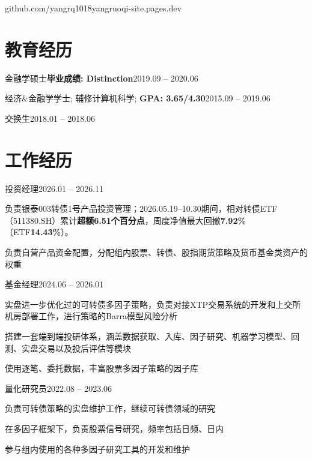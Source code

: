 \documentclass[a4paper,10pt]{article}
\begin{document}
  {github.com/yangrq1018}{yangruoqi-site.pages.dev}

\section{教育经历}

  {金融学硕士\quad\textbf{毕业成绩: Distinction}}{2019.09 -- 2020.06}

  {经济\&金融学学士; 辅修计算机科学; \textbf{GPA: 3.65/4.30}}{2015.09 -- 2019.06}

  {交换生}{2018.01 -- 2018.06}

\section{工作经历}

  {投资经理}{2026.01 -- 2026.11}
\begin{resumeItems}
  \item 负责银泰003转债1号产品投资管理；2026.05.19--10.30期间，相对转债ETF（511380.SH）累计\textbf{超额6.51个百分点}，周度净值最大回撤\textbf{7.92\%}（ETF\textbf{14.43\%}）。
  \item 负责自营产品资金配置，分配组内股票、转债、股指期货策略及货币基金类资产的权重
\end{resumeItems}

  {基金经理}{2024.06 -- 2026.01}
\begin{resumeItems}
  \item 实盘进一步优化过的可转债多因子策略，负责对接XTP交易系统的开发和上交所机房部署工作，进行策略的Barra模型风险分析
  \item 搭建一套端到端投研体系，涵盖数据获取、入库、因子研究、机器学习模型、回测、实盘交易以及\mbox{投后评估等模块}
  \item 使用逐笔、委托数据，丰富股票多因子策略的因子库
\end{resumeItems}

  {量化研究员}{2022.08 -- 2023.06}
\begin{resumeItems}
  \item 负责可转债策略的实盘维护工作，继续可转债领域的研究
  \item 在多因子框架下，负责股票信号研究，频率包括日频、日内
  \item 参与组内使用的各种多因子研究工具的开发和维护
\end{resumeItems}
\end{document}
